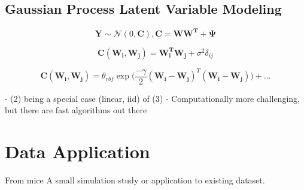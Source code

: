 \documentclass[english, 11pt]{article}\usepackage[]{graphicx}\usepackage[]{color}
\begin{document}
\subsection{Gaussian Process Latent Variable Modeling}

\begin{equation}
\mathbf{Y} \sim  \mathcal{N} (0, \mathbf{C}), \mathbf{C} = \mathbf{WW^T }+ \mathbf{\Psi}
\end{equation}

\begin{equation}
\mathbf{C}(\mathbf{W_i},\mathbf{W_j}) = \mathbf{W_i^T}\mathbf{W_j} + \sigma^2\delta_{ij}
\end{equation}

\begin{equation}
\mathbf{C}(\mathbf{W_i},\mathbf{W_j}) = \theta_{rbf} \exp \Big(\frac{-\gamma}{2}(\mathbf{W_i}-\mathbf{W_j})^{T}(\mathbf{W_i}-\mathbf{W_j})  \Big) + ...
\end{equation}


- (2) being a special case (linear, iid) of (3)
- Computationally more challenging, but there are fast algorithms out there






\section{Data Application}
From mice \cite{deng2014single}
A small simulation study or application to existing dataset.
\end{document}
